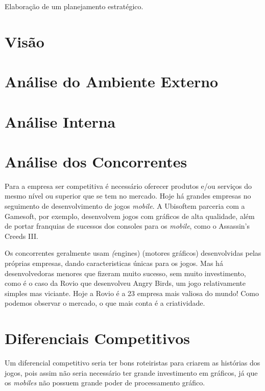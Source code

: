 \documentclass{abnt}
\begin{document}
	\capa
	
	\folhaderosto

	\sumario
	
	\begin{resumo}
		Elaboração de um planejamento estratégico.
	\end{resumo}

	\chapter {Visão}
	
	\chapter {Análise do Ambiente Externo}

	\chapter {Análise Interna}

	\chapter {Análise dos Concorrentes}
	
	Para a empresa ser competitiva é necessário oferecer produtos e/ou serviços do mesmo nível ou superior que se tem no mercado.
	Hoje há grandes empresas no seguimento de desenvolvimento de jogos \textit{mobile}. A Ubisoft\texttrademark em parceria com a Gamesoft\texttrademark, por exemplo, desenvolvem jogos com gráficos de alta qualidade, além de portar franquias de sucessos dos consoles para os \textit{mobile}, como o Assassin's Creeds III\textregistered.
	
	Os concorrentes geralmente usam \textit(engines) (motores gráficos) desenvolvidas pelas próprias empresas, dando caracteristicas únicas para os jogos.
	Mas há desenvolvedoras menores que fizeram muito sucesso, sem muito investimento, como é o caso da Rovio que desenvolveu Angry Birds\textregistered, um jogo relativamente simples mas viciante. Hoje a Rovio é a  23\textsuperscript{} empresa mais valiosa do mundo!
	Como podemos observar o mercado, o que mais conta é a criatividade.

	\chapter {Diferenciais Competitivos}
	Um diferencial competitivo seria ter bons roteiristas para criarem as histórias dos jogos, pois assim não seria necessário ter grande investimento em gráficos, já que os \textit{mobiles} não possuem grande poder de processamento gráfico.
	
\end{document}
